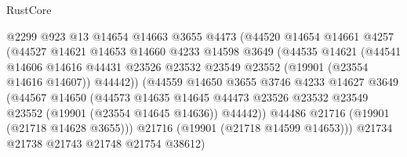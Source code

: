 \begin{lexlean}{RustCore}
\begin{coremodule}
                              @2299
                              @923
                              @13
                              @14654
                              @14663
                              @3655
                              @4473
                              (@44520
                                @14654
                                @14661
                                @4257
                                (@44527
                                  @14621
                                  @14653
                                  @14660
                                  @4233
                                  @14598
                                  @3649
                                  (@44535
                                    @14621
                                    (@44541
                                      @14606
                                      @14616
                                      @44431
                                      @23526
                                      @23532
                                      @23549
                                      @23552
                                      (@19901 (@23554 @14616 @14607))
                                      @44442))
                                  (@44559
                                    @14650
                                    @3655
                                    @3746
                                    @4233
                                    @14627
                                    @3649
                                    (@44567
                                      @14650
                                      (@44573
                                        @14635
                                        @14645
                                        @44473
                                        @23526
                                        @23532
                                        @23549
                                        @23552
                                        (@19901 (@23554 @14645 @14636))
                                        @44442))
                                    @44486
                                    @21716
                                    (@19901 (@21718 @14628 @3655)))
                                  @21716
                                  (@19901 (@21718 @14599 @14653)))
                                @21734
                                @21738
                                @21743
                                @21748
                                @21754
                                @38612)

\end{coremodule}
\end{lexlean}
